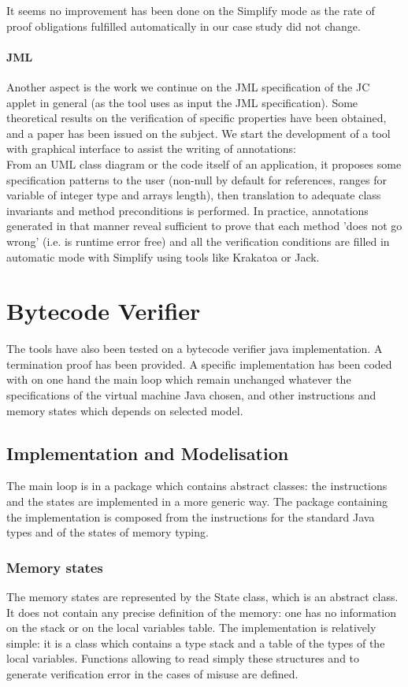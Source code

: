 It seems no improvement has been done on the Simplify mode as the rate 
of proof obligations fulfilled
 automatically in our case study did not change.

\paragraph{JML}
Another aspect is the work we continue on the JML specification of the
JC applet in general (as the tool uses as input the JML
specification). Some theoretical results on the verification of
specific properties have been obtained, and a paper has been issued on
the subject\cite{Rousset}. We start the development of a tool with
graphical interface to assist the writing of annotations:\\ From an
UML class diagram or the code itself of an application, it proposes
some specification patterns to the user (non-null by default for
references, ranges for variable of integer type and arrays length),
then translation to adequate class invariants and method preconditions
is performed. In practice, annotations generated in that manner reveal
sufficient to prove that each method 'does not go wrong' (i.e. is
runtime error free) and all the verification conditions are filled in
automatic mode with Simplify using tools like Krakatoa or Jack.


\section{Bytecode Verifier}
The tools have also been tested on a bytecode verifier java implementation. A termination proof has been provided.
A specific implementation has been coded with on one hand the main loop which remain unchanged whatever the specifications of the virtual machine Java chosen, and other instructions and memory states which depends on selected model.
\subsection{Implementation and Modelisation}
The main loop is in a package which contains abstract classes: 
the instructions and the states are implemented in a more generic way.
The package containing the implementation is composed from the instructions for the standard Java types and of the states of memory typing. 
\subsubsection {Memory states}
The memory states are represented by the State class, which is an abstract class.  It does not contain any precise definition of the memory: 
one has no information on the stack or on the local variables table. 
The implementation is relatively simple: 
it is a class which contains a type stack and a table of the types of the local variables. 
Functions allowing to read simply these structures and to generate verification error in the cases of misuse are defined.   
